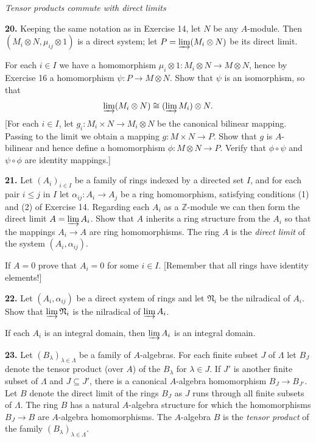 \medskip
\noindent\emph{Tensor products commute with direct limits}

\medskip
\noindent\textbf{20.} Keeping the same notation as in Exercise 14, let $N$ be any $A$-module.  Then
$(M_i\otimes N,\mu_{ij}\otimes1)$ is a direct system; let $P=\varinjlim(M_i\otimes N)$ be its direct limit.

For each $i\in I$ we have a homomorphism $\mu_i\otimes1:M_i\otimes N\longrightarrow M\otimes N$, hence by
Exercise 16 a homomorphism $\psi:P\longrightarrow M\otimes N$.  Show that $\psi$ is an isomorphism,
so that
\[
\varinjlim(M_i\otimes N)\cong(\varinjlim M_i)\otimes N.
\]
[For each $i\in I$, let $g_i:M_i\times N\longrightarrow M_i\otimes N$ be the canonical bilinear mapping.
Passing to the limit we obtain a mapping $g:M\times N\longrightarrow P$.  Show that $g$ is
$A$-bilinear and hence define a homomorphism $\phi:M\otimes N\longrightarrow P$.  Verify that
$\phi\circ\psi$ and $\psi\circ\phi$ are identity mappings.]

\medskip
\noindent\textbf{21.} Let $(A_i)_{i\in I}$ be a family of rings indexed by a directed set $I$, and for each pair $i\leq j$
in $I$ let $\alpha_{ij}:A_i\longrightarrow A_j$ be a ring homomorphism, satisfying conditions (1) and (2)
of Exercise 14.  Regarding each $A_i$ as a $\mathbb Z$-module we can then form the direct
limit $A=\varinjlim A_i$.  Show that $A$ inherits a ring structure from the $A_i$ so that the
mappings $A_i\longrightarrow A$ are ring homomorphisms.  The ring $A$ is the \emph{direct limit} of the
system $(A_i,\alpha_{ij})$.

If $A=0$ prove that $A_i=0$ for some $i\in I$.  [Remember that all rings have
identity elements!]

\medskip
\noindent\textbf{22.} Let $(A_i,\alpha_{ij})$ be a direct system of rings and let $\mathfrak N_i$ be the nilradical of $A_i$.  Show
that $\varinjlim\mathfrak N_i$ is the nilradical of $\varinjlim A_i$.

If each $A_i$ is an integral domain, then $\varinjlim A_i$ is an integral domain.

\medskip
\noindent\textbf{23.} Let $(B_\lambda)_{\lambda\in\Lambda}$ be a family of $A$-algebras.  For each finite subset $J$ of $\Lambda$ let $B_J$ denote
the tensor product (over $A$) of the $B_\lambda$ for $\lambda\in J$.  If $J'$ is another finite subset of $\Lambda$
and $J\subseteq J'$, there is a canonical $A$-algebra homomorphism $B_J\longrightarrow B_{J'}$.  Let $B$
denote the direct limit of the rings $B_J$ as $J$ runs through all finite subsets of $\Lambda$.
The ring $B$ has a natural $A$-algebra structure for which the homomorphisms
$B_J\longrightarrow B$ are $A$-algebra homomorphisms.  The $A$-algebra $B$ is the \emph{tensor product}
of the family $(B_\lambda)_{\lambda\in\Lambda}$.

